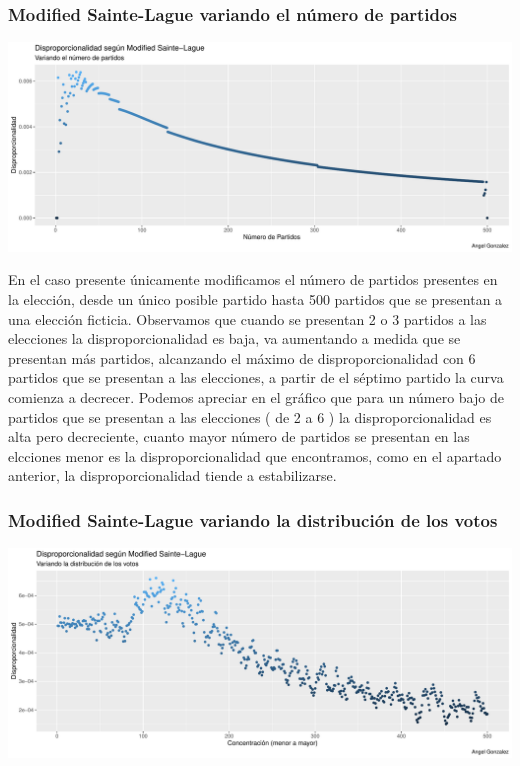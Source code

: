 \documentclass[12pt,a4paper,]{book}
\numberwithin{dummy}{section}
\theoremstyle{ocrenumbox}
\theoremstyle{blacknumex}
\theoremstyle{blacknumbox}
\theoremstyle{ocrenum}
\theoremstyle{ocrenum}
\begin{document}
\hypertarget{modified-sainte-lague-variando-el-nuxfamero-de-partidos}{%
\subsubsection{Modified Sainte-Lague variando el número de
partidos}\label{modified-sainte-lague-variando-el-nuxfamero-de-partidos}}

\begin{center}\includegraphics[width=0.95\linewidth]{figurasR/unnamed-chunk-20-1} \end{center}

En el caso presente únicamente modificamos el número de partidos
presentes en la elección, desde un único posible partido hasta 500
partidos que se presentan a una elección ficticia. Observamos que cuando
se presentan 2 o 3 partidos a las elecciones la disproporcionalidad es
baja, va aumentando a medida que se presentan más partidos, alcanzando
el máximo de disproporcionalidad con 6 partidos que se presentan a las
elecciones, a partir de el séptimo partido la curva comienza a decrecer.
Podemos apreciar en el gráfico que para un número bajo de partidos que
se presentan a las elecciones ( de 2 a 6 ) la disproporcionalidad es
alta pero decreciente, cuanto mayor número de partidos se presentan en
las elcciones menor es la disproporcionalidad que encontramos, como en
el apartado anterior, la disproporcionalidad tiende a estabilizarse.

\hypertarget{modified-sainte-lague-variando-la-distribuciuxf3n-de-los-votos}{%
\subsubsection{Modified Sainte-Lague variando la distribución de los
votos}\label{modified-sainte-lague-variando-la-distribuciuxf3n-de-los-votos}}

\begin{center}\includegraphics[width=0.95\linewidth]{figurasR/unnamed-chunk-21-1} \end{center}
\end{document}
